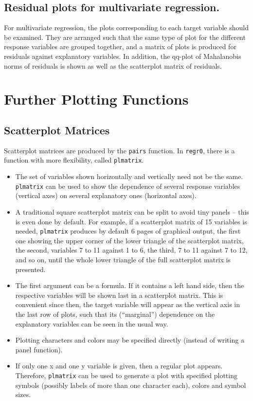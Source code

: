 \documentclass{article}
\providecommand{\T}{\texttt}
\providecommand{\Vneed}[1]{\penalty-5000\vskip#1%
\penalty-5000\vspace{-#1}}
\begin{document}
\subsection{Residual plots for multivariate regression.}
For multivariate regression, the plots corresponding to each target
variable should be examined. 
They are arranged such that the same type of plot for the different
response variables are grouped together, and a matrix of plots is produced
for residuals against explanatory variables.
In addition, the qq-plot of Mahalanobis norms of residuals is shown as well
as the scatterplot matrix of residuals.

\Vneed{30mm}
\section{Further Plotting Functions}
\subsection{Scatterplot Matrices}
Scatterplot matrices are produced by the \T{pairs} function.
In \T{regr0}, there is a function with more flexibility, called
\T{plmatrix}.
\begin{itemize}
\item 
  The set of variables shown horizontally and vertically need not be the
  same. \T{plmatrix} can be used to show the dependence of several 
  response variables (vertical axes) on several explanatory ones
  (horizontal axes).
\item
  A traditional square scatterplot matrix can be split to avoid
  tiny panels -- this is even done by default. For example, if 
  a scatterplot matrix of 15 variables is needed, 
  \T{plmatrix} produces by default 6 pages of graphical output,
  the first one showing the %
  upper corner of the lower triangle of the scatterplot matrix,
  the second, variables 7 to 11 against 1 to 6, the third, 
  7 to 11 against 7 to 12, and so on, until the whole lower triangle
  of the full scatterplot matrix is presented.
\item
  The first argument can be a formula. If it contains a left hand side,
  then the respective variables will be shown last in a scatterplot
  matrix. This is convenient since then, the target variable will appear as
  the vertical axis in the last row of plots, such that its (``marginal'')
  dependence on the explanatory variables can be seen in the usual way.
\item
  Plotting characters and colors may be specified directly (instead of 
  writing a panel function).
\item
  If only one x and one y variable is given, then a regular plot appears.
  Therefore, \T{plmatrix} can be used to generate a plot with specified
  plotting symbols (possibly labels of more than one character each),
  colors and symbol sizes.
\end{itemize}
\end{document}
